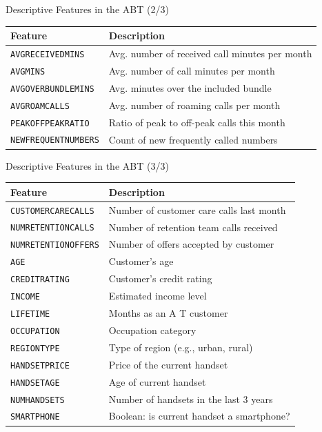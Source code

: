 \documentclass[aspectratio=169,xcolor=dvipsnames]{beamer}
\begin{document}
\begin{frame}{Descriptive Features in the ABT (2/3)}

\begin{tabular}{p{} p{}}
\textbf{Feature} & \textbf{Description} \\
\hline
\texttt{AVGRECEIVEDMINS} & Avg. number of received call minutes per month \\
\texttt{AVGMINS} & Avg. number of call minutes per month \\
\texttt{AVGOVERBUNDLEMINS} & Avg. minutes over the included bundle \\
\texttt{AVGROAMCALLS} & Avg. number of roaming calls per month \\
\texttt{PEAKOFFPEAKRATIO} & Ratio of peak to off-peak calls this month \\
\texttt{NEWFREQUENTNUMBERS} & Count of new frequently called numbers \\
\end{tabular}

\end{frame}

\begin{frame}{Descriptive Features in the ABT (3/3)}

\begin{tabular}{p{} p{}}
\textbf{Feature} & \textbf{Description} \\
\hline
\texttt{CUSTOMERCARECALLS} & Number of customer care calls last month \\
\texttt{NUMRETENTIONCALLS} & Number of retention team calls received \\
\texttt{NUMRETENTIONOFFERS} & Number of offers accepted by customer \\
\texttt{AGE} & Customer’s age \\
\texttt{CREDITRATING} & Customer’s credit rating \\
\texttt{INCOME} & Estimated income level \\
\texttt{LIFETIME} & Months as an A T customer \\
\texttt{OCCUPATION} & Occupation category \\
\texttt{REGIONTYPE} & Type of region (e.g., urban, rural) \\
\texttt{HANDSETPRICE} & Price of the current handset \\
\texttt{HANDSETAGE} & Age of current handset \\
\texttt{NUMHANDSETS} & Number of handsets in the last 3 years \\
\texttt{SMARTPHONE} & Boolean: is current handset a smartphone? \\
\end{tabular}

\end{frame}
\end{document}
